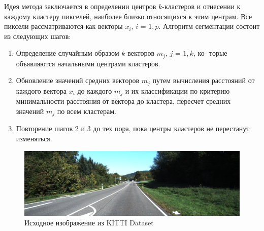 Идея метода заключается в определении центров $k$-кластеров и
отнесении к каждому кластеру пикселей, наиболее близко относящихся к этим центрам. Все пиксели рассматриваются как векторы
$x_i$, $i$ = $\overline{1, p}$. Алгоритм сегментации состоит из следующих шагов:

\begin{enumerate}
\item Определение случайным образом $k$ векторов $m_j$, $j$ = $\overline{1, k}$, ко-
торые объявляются начальными центрами кластеров.
\item Обновление значений средних векторов $m_j$ путем вычисления
расстояний от каждого вектора $x_i$ до каждого $m_j$ и их классификации по критерию минимальности расстояния от вектора
до кластера, пересчет средних значений $m_j$ по всем кластерам.
\item Повторение шагов 2 и 3 до тех пора, пока центры кластеров
не перестанут изменяться.
\end{enumerate}

\begin{figure}[ht]
    \includegraphics[width=\textwidth]{../source/road.png}
    \caption{Исходное изображение из KITTI Dataset}
    \label{fig:р}
\end{figure}

